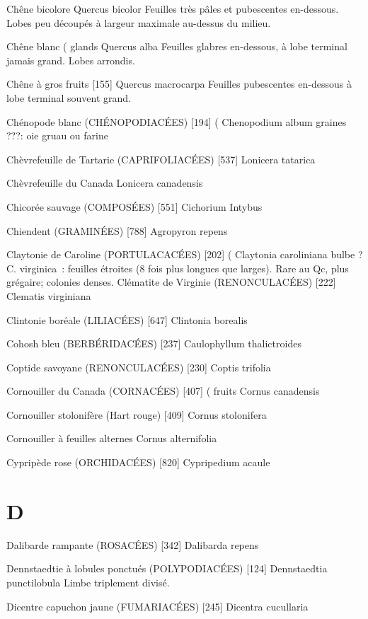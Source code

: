 Chêne bicolore
				Quercus bicolor
Feuilles très pâles et pubescentes en-dessous. Lobes peu découpés à largeur maximale au-dessus du milieu.

Chêne blanc							( glands
				Quercus alba
Feuilles glabres en-dessous, à lobe terminal jamais grand. Lobes arrondis.


Chêne à gros fruits  [155]
				Quercus macrocarpa
Feuilles pubescentes en-dessous à lobe terminal souvent grand.

Chénopode blanc (CHÉNOPODIACÉES)  [194]		(
				Chenopodium album			graines
???: oie							gruau ou farine

Chèvrefeuille de Tartarie (CAPRIFOLIACÉES)  [537]
				Lonicera tatarica

Chèvrefeuille du Canada 
				Lonicera canadensis

Chicorée sauvage (COMPOSÉES)  [551]
				Cichorium Intybus

Chiendent (GRAMINÉES)  [788]
				Agropyron repens

Claytonie de Caroline (PORTULACACÉES)  [202]			(
				Claytonia caroliniana			bulbe
? C. virginica : feuilles étroites (8 fois plus longues que larges).
Rare au Qc, plus grégaire; colonies denses.
Clématite de Virginie (RENONCULACÉES)  [222]
				Clematis virginiana

Clintonie boréale (LILIACÉES)  [647]
				Clintonia borealis

Cohosh bleu (BERBÉRIDACÉES)  [237]
				Caulophyllum thalictroides

Coptide savoyane (RENONCULACÉES)  [230]
				Coptis trifolia

Cornouiller du Canada (CORNACÉES)  [407]			( fruits
				Cornus canadensis

Cornouiller stolonifère (Hart rouge)  [409]
				Cornus stolonifera

Cornouiller à feuilles alternes
				Cornus alternifolia

Cypripède rose (ORCHIDACÉES)  [820]
				Cypripedium acaule

\chapter*{D}

Dalibarde rampante (ROSACÉES)  [342]
				Dalibarda repens

Dennstaedtie à lobules ponctués (POLYPODIACÉES) [124]
				Dennstaedtia punctilobula
Limbe triplement divisé.

Dicentre capuchon jaune (FUMARIACÉES)  [245]
				Dicentra cucullaria

